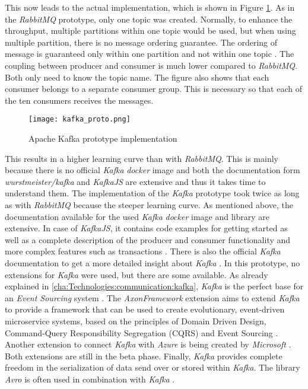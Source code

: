 This now leads to the actual implementation, which is shown in Figure \ref{img:kafkaproto}.
As in the \textit{RabbitMQ} prototype, only one topic was created.
Normally, to enhance the throughput, multiple partitions within one topic would be used, but when using multiple partition, there is no message ordering guarantee.
The ordering of message is guaranteed only within one partition and not within one topic \cite[p.~30]{Kumar.2017}.
The coupling between producer and consumer is much lower compared to \textit{RabbitMQ}.
Both only need to know the topic name.
The figure also shows that each consumer belongs to a separate consumer group.
This is necessary so that each of the ten consumers receives the messages.

\begin{figure}[h]
	\centering
	\texttt{[image: kafka\_proto.png]}
	\caption{Apache Kafka prototype implementation}
	\label{img:kafkaproto}
\end{figure}

This results in a higher learning curve than with \textit{RabbitMQ}.
This is mainly because there is no official \textit{Kafka} \textit{docker} image and both the documentation form \textit{wurstmeister/kafka} and \textit{KafkaJS} are extensive and thus it takes time to understand them.
The implementation of the \textit{Kafka} prototype took twice as long as with \textit{RabbitMQ} because the steeper learning curve.
As mentioned above, the documentation available for the used \textit{Kafka} \textit{docker} image and library are extensive.
In case of \textit{KafkaJS}, it contains code examples for getting started as well as a complete description of the producer and consumer functionality and more complex features such as transactions \cite{TulioOrnelas.2020}.
There is also the official \textit{Kafka} documentation to get a more detailed insight about \textit{Kafka} \cite{ApacheKafka.01.06.2020}.
In this prototype, no extensions for \textit{Kafka} were used, but there are some available.
As already explained in \ref{cha:Technologies:communication:kafka}, \textit{Kafka} is the perfect base for an \textit{Event Sourcing} system \cite[p.~19]{Stopford.2018}.
The \textit{AxonFramework} extension aims to extend \textit{Kafka} to provide a framework that can be used to create evolutionary, event-driven microservice systems, based on the principles of Domain Driven Design, Command-Query Responsibility Segregation (CQRS) and Event Sourcing \cite{StevenvanBeelen.29.05.2020}.
Another extension to connect \textit{Kafka} with \textit{Azure} is being created by \textit{Microsoft} \cite{Microsoft.28.05.2020}.
Both extensions are still in the beta phase.
Finally, \textit{Kafka} provides complete freedom in the serialization of data send over or stored within \textit{Kafka}.
The library \textit{Avro} is often used in combination with \textit{Kafka} \cite{JayKreps.2015}.

